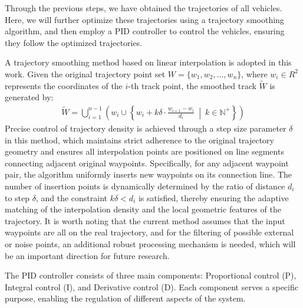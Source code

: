 \documentclass[journal,twoside,web]{ieeecolor}
\begin{document}
Through the previous steps, we have obtained the trajectories of all vehicles. 
Here, we will further optimize these trajectories using a trajectory smoothing algorithm, and then employ a PID controller to control the vehicles, ensuring they follow the optimized trajectories\cite{Alpher22d}. 

A trajectory smoothing method based on linear interpolation is adopted in this work.
Given the original trajectory point set \(W = \{w_1,w_2 ,…,w_n\}\), where \(w_i \in R^2\) represents the coordinates of the \(i\)-th track point, the smoothed track \(\widetilde{W}\) is generated by:
\begin{align}
	\widetilde{W} = \bigcup_{i = 1}^{n-1} \left( w_i \cup \left\{ w_i + k\delta \cdot \frac{w_{i+1} - w_i}{d_i} \ \middle|\ k \in \mathbb{N}^+\right\} \right)
\end{align}
Precise control of trajectory density is achieved through a step size parameter \(\delta\) in this method, which maintains strict adherence to the original trajectory geometry and ensures all interpolation points are positioned on line segments connecting adjacent original waypoints.
Specifically, for any adjacent waypoint pair, the algorithm uniformly inserts new waypoints on its connection line. The number of insertion points is dynamically determined by the ratio of distance \(d_i\) to step \(\delta\), and the constraint \(k\delta < d_i\) is satisfied, thereby ensuring the adaptive matching of the interpolation density and the local geometric features of the trajectory.
It is worth noting that the current method assumes that the input waypoints are all on the real trajectory, and for the filtering of possible external or noise points, an additional robust processing mechanism is needed, which will be an important direction for future research.

The PID controller consists of three main components: Proportional control (P), Integral control (I), and Derivative control (D). Each component serves a specific purpose, enabling the regulation of different aspects of the system.
\end{document}
